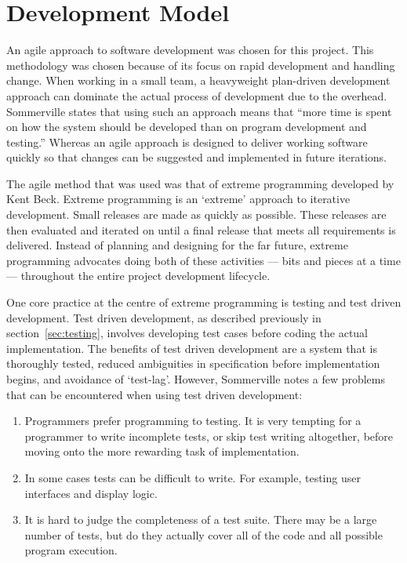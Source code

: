 \section{Development Model}
\label{sec:devmodel}

An agile approach to software development was chosen for this project. This methodology was
chosen because of its focus on rapid development and handling change. When working in a small
team, a heavyweight plan-driven development approach can dominate the actual process of development
due to the overhead. Sommerville states that using such an approach means that ``more time is
spent on how the system should be developed than on program development and testing.''
Whereas an agile approach is designed to deliver working software quickly so that changes
can be suggested and implemented in future iterations.

The agile method that was used was that of extreme programming developed by Kent Beck.\cite{beck1999}\cite{beck2000}
Extreme programming is an `extreme' approach to iterative development. Small releases are made
as quickly as possible. These releases are then evaluated and iterated on until a final release
that meets all requirements is delivered. Instead of planning and designing for the far future,
extreme programming advocates doing both of these activities --- bits and pieces at a time ---
throughout the entire project development lifecycle.


One core practice at the centre of extreme programming is testing and test driven development.
Test driven development, as described previously in section~\ref{sec:testing}, involves
developing test cases before coding the actual implementation. The benefits of test driven
development are a system that is thoroughly tested, reduced ambiguities in specification before
implementation begins, and avoidance of `test-lag'. However, Sommerville notes a few problems
that can be encountered when using test driven development:

\begin{enumerate}
\item Programmers prefer programming to testing. It is very tempting for a programmer to write
      incomplete tests, or skip test writing altogether, before moving onto the more rewarding
      task of implementation.

\item In some cases tests can be difficult to write. For example, testing user interfaces and
      display logic.

\item It is hard to judge the completeness of a test suite. There may be a large number of tests,
      but do they actually cover all of the code and all possible program execution.
\end{enumerate}

